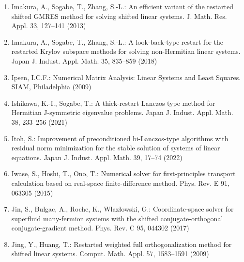 \begin{enumerate}[label=\arabic*.,ref=\arabic*,leftmargin=3em]
\item\label{bib:source-105}Imakura, A., Sogabe, T., Zhang, S.-L.: An efficient variant of the restarted shifted GMRES method for solving shifted linear systems. J. Math. Res. Appl. 33, 127–141 (2013)

\item\label{bib:source-106}Imakura, A., Sogabe, T., Zhang, S.-L.: A look-back-type restart for the restarted Krylov subspace methods for solving non-Hermitian linear systems. Japan J. Indust. Appl. Math. 35, 835–859 (2018)

\item\label{bib:source-107}Ipsen, I.C.F.: Numerical Matrix Analysis: Linear Systems and Least Squares. SIAM, Philadelphia (2009)

\item\label{bib:source-108}Ishikawa, K.-I., Sogabe, T.: A thick-restart Lanczos type method for Hermitian J-symmetric eigenvalue problems. Japan J. Indust. Appl. Math. 38, 233–256 (2021)

\item\label{bib:source-109}Itoh, S.: Improvement of preconditioned bi-Lanczos-type algorithms with residual norm minimization for the stable solution of systems of linear equations. Japan J. Indust. Appl. Math. 39, 17–74 (2022)

\item\label{bib:source-110}Iwase, S., Hoshi, T., Ono, T.: Numerical solver for first-principles transport calculation based on real-space finite-difference method. Phys. Rev. E 91, 063305 (2015)

\item\label{bib:source-111}Jin, S., Bulgac, A., Roche, K., Wlazłowski, G.: Coordinate-space solver for superfluid many-fermion systems with the shifted conjugate-orthogonal conjugate-gradient method. Phys. Rev. C 95, 044302 (2017)

\item\label{bib:source-112}Jing, Y., Huang, T.: Restarted weighted full orthogonalization method for shifted linear systems. Comput. Math. Appl. 57, 1583–1591 (2009)


\end{enumerate}
